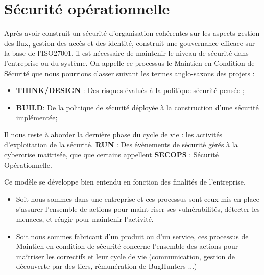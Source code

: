 

\section{Sécurité opérationnelle}

Après avoir construit un sécurité d'organisation cohérentes sur les aspects gestion des flux, gestion des accès et des identité, construit une gouvernance efficace sur la base de l'ISO27001, il est nécessaire de maintenir le niveau de sécurité dans l'entreprise ou du système.
On appelle ce processus le Maintien en Condition de Sécurité que nous pourrions classer suivant les termes anglo-saxons des projets :

\begin{itemize}
 \item \textbf{THINK/DESIGN} : Des risques évalués à la politique sécurité pensée ;
 \item \textbf{BUILD}: De la politique de sécurité déployée à la construction d’une sécurité implémentée;
\end{itemize}

Il nous reste à aborder la dernière phase du cycle de vie : les activités d'exploitation de la sécurité. \textbf{RUN} : Des évènements de sécurité gérés à la cybercrise maitrisée, que que certains appellent \textbf{SECOPS} : Sécurité Opérationnelle.


Ce modèle se développe bien entendu en fonction des finalités de l'entreprise.

\begin{itemize}
    \item Soit nous sommes dans une entreprise et ces processus sont ceux mis en place s'assurer l'ensemble de actions pour maint riser ses vulnérabilités, détecter les menaces, et réagir pour maintenir l'activité.
    \item  Soit nous sommes fabricant d'un produit ou d'un service, ces processus de Maintien en condition de sécurité concerne l'ensemble des actions pour maîtriser les correctifs et leur cycle de vie (communication, gestion de découverte par des tiers, rémunération de BugHunters ...)
\end{itemize}



